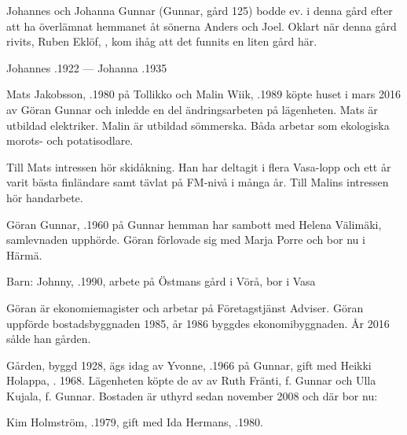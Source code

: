 

Johannes och Johanna Gunnar (Gunnar, gård 125) bodde ev. i denna gård efter att ha överlämnat hemmanet åt sönerna Anders och Joel. Oklart när denna gård rivits, Ruben Eklöf, , kom ihåg att det funnits en liten gård här.

Johannes .1922  ---  Johanna .1935






Mats Jakobsson, .1980 på Tollikko och Malin Wiik, .1989 köpte huset i mars 2016 av Göran Gunnar och inledde en del ändringsarbeten på lägenheten. Mats är utbildad elektriker. Malin är utbildad sömmerska. Båda arbetar som ekologiska morots- och potatisodlare.

Till Mats intressen hör skidåkning. Han har deltagit i flera Vasa-lopp och ett år varit bästa finländare samt tävlat på FM-nivå i många år. Till Malins intressen hör handarbete.


Göran Gunnar, .1960 på Gunnar hemman har sambott med Helena Välimäki, samlevnaden upphörde. Göran förlovade sig med Marja Porre och bor nu i Härmä.

Barn: Johnny, .1990, arbete på Östmans gård i Vörå, bor i Vasa

Göran är ekonomiemagister och arbetar på Företagstjänst Adviser. Göran uppförde bostadsbyggnaden 1985, år 1986 byggdes ekonomibyggnaden. År 2016 sålde han gården.






Gården, byggd 1928, ägs idag av Yvonne, .1966 på Gunnar, gift med Heikki Holappa, . 1968. Lägenheten köpte de av av Ruth Fränti, f. Gunnar och Ulla Kujala, f. Gunnar. Bostaden är uthyrd sedan november 2008 och där bor nu:

Kim Holmström, .1979, gift med Ida Hermans, .1980.
\begin{jhchildren}
  \item {}
  \item {}
  \item {}
\end{jhchildren}


